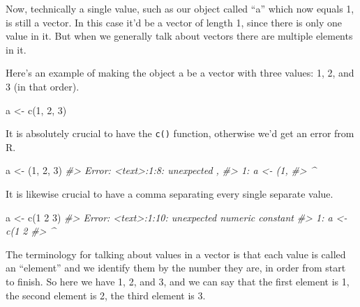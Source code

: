 \documentclass[
]{krantz}
\makeatletter
\newenvironment{Shaded}{\begin{snugshade}}{\end{snugshade}}
\newcommand{\CommentTok}[1]{\textcolor[rgb]{0.37,0.37,0.37}{\textit{#1}}}
\newcommand{\DecValTok}[1]{\textcolor[rgb]{0.06,0.06,0.06}{#1}}
\newcommand{\FunctionTok}[1]{\textcolor[rgb]{0,0,0}{#1}}
\newcommand{\NormalTok}[1]{#1}
\newcommand{\OtherTok}[1]{\textcolor[rgb]{0.37,0.37,0.37}{#1}}
\newenvironment{kframe}{%
\medskip{}
\setlength{\fboxsep}{.8em}
 \def\at@end@of@kframe{}%
 \ifinner\ifhmode%
  \def\at@end@of@kframe{\end{minipage}}%
  \begin{minipage}{\columnwidth}%
 \fi\fi%
 \def\FrameCommand##1{\hskip\@totalleftmargin \hskip-\fboxsep
 \colorbox{shadecolor}{##1}\hskip-\fboxsep
     \hskip-\linewidth \hskip-\@totalleftmargin \hskip\columnwidth}%
 \MakeFramed {\advance\hsize-\width
   \@totalleftmargin\z@ \linewidth\hsize
   \@setminipage}}%
 {\par\unskip\endMakeFramed%
 \at@end@of@kframe}
\renewenvironment{Shaded}{\begin{kframe}}{\end{kframe}}
\makeatother
\begin{document}
Now, technically a single value, such as our object called ``a'' which now equals 1, is still a vector. In this case it'd be a vector of length 1, since there is only one value in it. But when we generally talk about vectors there are multiple elements in it.

Here's an example of making the object a be a vector with three values: 1, 2, and 3 (in that order).

\begin{Shaded}
\begin{Highlighting}[]
\NormalTok{a }\OtherTok{\textless{}{-}} \FunctionTok{c}\NormalTok{(}\DecValTok{1}\NormalTok{, }\DecValTok{2}\NormalTok{, }\DecValTok{3}\NormalTok{)}
\end{Highlighting}
\end{Shaded}

It is absolutely crucial to have the \texttt{c()} function, otherwise we'd get an error from R.

\begin{Shaded}
\begin{Highlighting}[]
\NormalTok{a }\OtherTok{\textless{}{-}}\NormalTok{ (}\DecValTok{1}\NormalTok{, }\DecValTok{2}\NormalTok{, }\DecValTok{3}\NormalTok{)}
\CommentTok{\#\textgreater{} Error: \textless{}text\textgreater{}:1:8: unexpected \textquotesingle{},\textquotesingle{}}
\CommentTok{\#\textgreater{} 1: a \textless{}{-} (1,}
\CommentTok{\#\textgreater{}            \^{}}
\end{Highlighting}
\end{Shaded}

It is likewise crucial to have a comma separating every single separate value.

\begin{Shaded}
\begin{Highlighting}[]
\NormalTok{a }\OtherTok{\textless{}{-}} \FunctionTok{c}\NormalTok{(}\DecValTok{1} \DecValTok{2} \DecValTok{3}\NormalTok{)}
\CommentTok{\#\textgreater{} Error: \textless{}text\textgreater{}:1:10: unexpected numeric constant}
\CommentTok{\#\textgreater{} 1: a \textless{}{-} c(1 2}
\CommentTok{\#\textgreater{}              \^{}}
\end{Highlighting}
\end{Shaded}

The terminology for talking about values in a vector is that each value is called an ``element'' and we identify them by the number they are, in order from start to finish. So here we have 1, 2, and 3, and we can say that the first element is 1, the second element is 2, the third element is 3.
\end{document}
